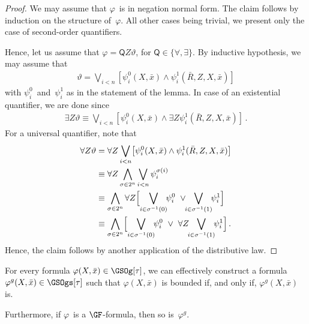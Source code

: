\documentclass{LMCS}
\begin{document}
\begin{proof}
We may assume that $\varphi$~is in negation normal form.
The claim follows by induction on the structure of~$\varphi$.
All other cases being trivial, we present only the case of second-order quantifiers.

Hence, let us assume that $\varphi = \mathsf{Q}Z\vartheta$, for $\mathsf{Q} \in \{\forall,\exists\}$.
By inductive hypothesis, we may assume that
\begin{align*}
  \vartheta = \bigvee_{i < n}[\psi^0_i(X,\bar x) \land \psi^1_i(\bar R,Z,X,\bar x)]
\end{align*}
with $\psi^0_i$~and~$\psi^1_i$ as in the statement of the lemma.
In case of an existential quantifier, we are done since
\begin{align*}
  \exists Z\vartheta \equiv \bigvee_{i < n}[\psi^0_i(X,\bar x) \land \exists Z\psi^1_i(\bar R,Z,X,\bar x)]\,.
\end{align*}
For a universal quantifier, note that
\begin{align*}
  \forall Z\vartheta
  &= \forall Z\bigvee_{i < n}\bigl[\psi^0_i(X,\bar x) \land \psi^1_i(\bar R,Z,X,\bar x)\bigr] \\
  &\equiv \forall Z\bigwedge_{\sigma \in 2^n} \bigvee_{i < n} \psi^{\sigma(i)}_i \\
  &\equiv \bigwedge_{\sigma \in 2^n} \forall Z
          \Bigl[\bigvee_{i \in \sigma^{-1}(0)} \!\!\psi^0_i \ \lor\!\! \bigvee_{i \in \sigma^{-1}(1)} \!\!\psi^1_i\Bigr] \\
  &\equiv \bigwedge_{\sigma \in 2^n}
          \Bigl[\bigvee_{i \in \sigma^{-1}(0)} \!\!\psi^0_i \ \lor\ \forall Z\!\!\bigvee_{i \in \sigma^{-1}(1)} \!\!\psi^1_i\Bigr]\,.
\end{align*}
Hence, the claim follows by another application of the distributive law.
\end{proof}
\begin{prop}\label{prop: GSOg reduces to GSOgs}
For every formula $\varphi(X,\bar x) \in \GSOg[\tau]$,
we can effectively construct a formula $\varphi^g(X,\bar x) \in \GSOgs[\tau]$
such that $\varphi(X,\bar x)$ is bounded if, and only if, $\varphi^g(X,\bar x)$ is.

Furthermore, if $\varphi$~is a $\GF$-formula, then so is~$\varphi^g$.
\end{prop}
\end{document}
